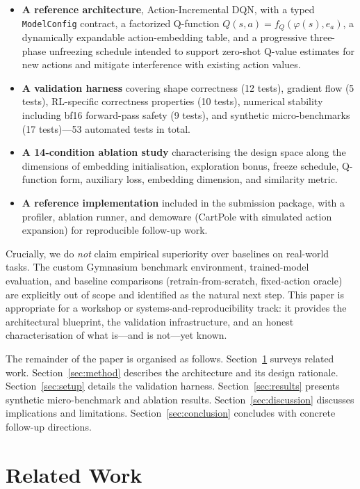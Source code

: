 \documentclass{article}
\begin{document}
\begin{itemize}
  \item \textbf{A reference architecture}, Action-Incremental DQN, with a typed
  \texttt{ModelConfig} contract, a factorized Q-function
  $Q(s,a)=f_Q(\varphi(s),e_a)$, a dynamically expandable action-embedding
  table, and a progressive three-phase unfreezing schedule intended to support
  zero-shot Q-value estimates for new actions and mitigate interference with
  existing action values.
  \item \textbf{A validation harness} covering shape correctness (12 tests),
  gradient flow (5 tests), RL-specific correctness properties (10 tests),
  numerical stability including bf16 forward-pass safety (9 tests), and
  synthetic micro-benchmarks (17 tests)---53 automated tests in total.
  \item \textbf{A 14-condition ablation study} characterising the design space
  along the dimensions of embedding initialisation, exploration bonus, freeze
  schedule, Q-function form, auxiliary loss, embedding dimension, and
  similarity metric.
  \item \textbf{A reference implementation} included in the submission package,
  with a profiler, ablation runner, and demoware (CartPole with simulated
  action expansion) for reproducible follow-up work.
\end{itemize}

Crucially, we do \emph{not} claim empirical superiority over baselines on
real-world tasks. The custom Gymnasium benchmark environment, trained-model
evaluation, and baseline comparisons (retrain-from-scratch, fixed-action
oracle) are explicitly out of scope and identified as the natural next step.
This paper is appropriate for a workshop or systems-and-reproducibility track:
it provides the architectural blueprint, the validation infrastructure, and an
honest characterisation of what is---and is not---yet known.

The remainder of the paper is organised as follows. Section~\ref{sec:related}
surveys related work. Section~\ref{sec:method} describes the architecture and
its design rationale. Section~\ref{sec:setup} details the validation harness.
Section~\ref{sec:results} presents synthetic micro-benchmark and ablation
results. Section~\ref{sec:discussion} discusses implications and limitations.
Section~\ref{sec:conclusion} concludes with concrete follow-up directions.


\section{Related Work}
\label{sec:related}
\end{document}
